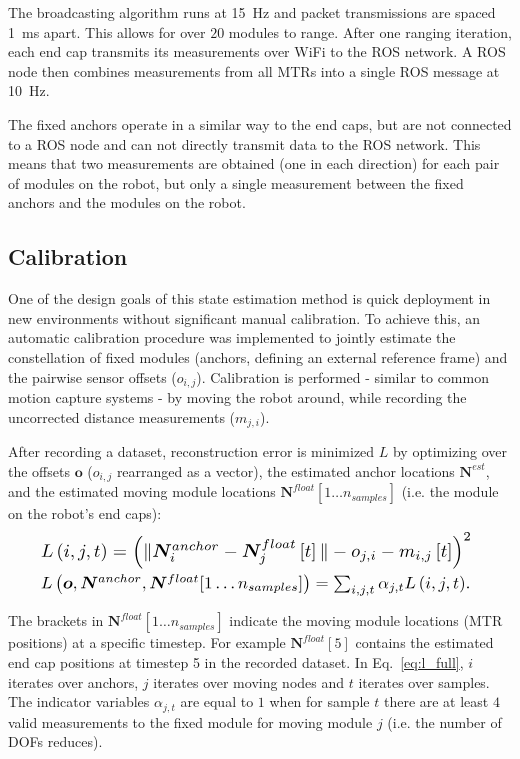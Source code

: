 {The broadcasting algorithm runs at \SI{15}{\hertz} and packet transmissions are spaced \SI{1}{\milli\second} apart.
This allows for over $20$ modules to range.
After one ranging iteration, each end cap transmits its measurements over WiFi to the ROS network. 
A ROS node then combines measurements from all MTRs into a single ROS message at  \SI{10}{\hertz}.

The fixed anchors operate in a similar way to the end caps, but are not connected to a ROS node and can not directly transmit data to the ROS network.
This means that two measurements are obtained (one in each direction) for each pair of modules on the robot, 
but only a single measurement between the fixed anchors and the modules on the robot.


\subsection{Calibration}
\label{txt:calib}
One of the design goals of this state estimation method is quick deployment in new environments without significant manual calibration.
To achieve this, an automatic calibration procedure was implemented to jointly estimate the constellation of fixed modules (anchors, defining an external reference frame) 
and the pairwise sensor offsets ($o_{i,j}$).
Calibration is performed - similar to common motion capture systems - by moving the robot around, while recording the uncorrected distance measurements ($m_{j,i}$).

After recording a dataset, reconstruction error is minimized $L$ by optimizing over the offsets $\bm{o}$ ($o_{i,j}$ rearranged as a vector), the estimated anchor locations $\bm{N}^{est}$, and the estimated moving module locations $\bm{N}^{float}[1\ldots n_{samples}]$ (i.e. the module on the robot's end caps):
\begin{align}
\resizebox{.91\hsize}{!}{$L\left(i,j,t\right) = \left( \|\bm{N}^{anchor}_i - \bm{N}^{float}_{j}\left[t\right]\|-o_{j,i} - m_{i,j}\left[t\right] \right)^2$ \label{eq:l_single}}\\
\resizebox{.91\hsize}{!}{$L\left(\bm{o},\bm{N}^{anchor},\bm{N}^{float}[1\ldots n_{samples}]\right) = \sum_{i,j,t}\alpha_{j,t}L\left(i,j,t\right)$. \label{eq:l_full}}
\end{align}

The brackets in $\bm{N}^{float}[1\ldots n_{samples}]$ indicate the moving module locations (MTR positions) at a specific timestep. 
For example $\bm{N}^{float}[5]$ contains the estimated end cap positions at timestep 5 in the recorded dataset.
In Eq.~\ref{eq:l_full}, $i$ iterates over anchors, $j$ iterates over moving nodes and $t$ iterates over samples.
The indicator variables $\alpha_{j,t}$ are equal to $1$ when for sample $t$ there are at least $4$ valid measurements to the fixed module for moving module $j$ (i.e. the number of DOFs reduces).

}
